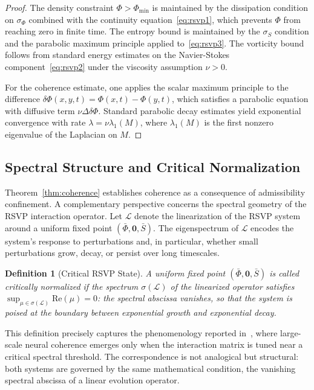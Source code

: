 \documentclass[11pt, oneside]{article}
\numberwithin{equation}{section}
\theoremstyle{rsvpstyle}
\newtheorem{definition}[theorem]{Definition}
\theoremstyle{remark}
\begin{document}
\begin{proof}
The density constraint $\Phi > \Phi_\text{min}$ is maintained by the dissipation
condition on $\sigma_\Phi$ combined with the continuity equation~\eqref{eq:rsvp1}, which
prevents $\Phi$ from reaching zero in finite time. The entropy bound is maintained by
the $\sigma_S$ condition and the parabolic maximum principle applied to~\eqref{eq:rsvp3}.
The vorticity bound follows from standard energy estimates on the Navier-Stokes
component~\eqref{eq:rsvp2} under the viscosity assumption $\nu > 0$.

For the coherence estimate, one applies the scalar maximum principle to the difference
$\delta\Phi(x,y,t) = \Phi(x,t) - \Phi(y,t)$, which satisfies a parabolic equation with
diffusive term $\nu \Delta \delta\Phi$. Standard parabolic decay estimates yield
exponential convergence with rate $\lambda = \nu \lambda_1(M)$, where $\lambda_1(M)$
is the first nonzero eigenvalue of the Laplacian on $M$.
\end{proof}

\subsection{Spectral Structure and Critical Normalization}

Theorem~\ref{thm:coherence} establishes coherence as a consequence of admissibility
confinement. A complementary perspective concerns the spectral geometry of the RSVP
interaction operator. Let $\mathcal{L}$ denote the linearization of the RSVP system
around a uniform fixed point $(\bar\Phi, \mathbf{0}, \bar S)$. The eigenspectrum of
$\mathcal{L}$ encodes the system's response to perturbations and, in particular, whether
small perturbations grow, decay, or persist over long timescales.

\begin{definition}[Critical RSVP State]
A uniform fixed point $(\bar\Phi, \mathbf{0}, \bar S)$ is called critically normalized
if the spectrum $\sigma(\mathcal{L})$ of the linearized operator satisfies
$\sup_{\mu \in \sigma(\mathcal{L})} \mathrm{Re}(\mu) = 0$: the spectral abscissa
vanishes, so that the system is poised at the boundary between exponential growth and
exponential decay.
\end{definition}

This definition precisely captures the phenomenology reported in~\cite{Pachitariu2026Critical},
where large-scale neural coherence emerges only when the interaction matrix is tuned
near a critical spectral threshold. The correspondence is not analogical but structural:
both systems are governed by the same mathematical condition, the vanishing spectral
abscissa of a linear evolution operator.
\end{document}
